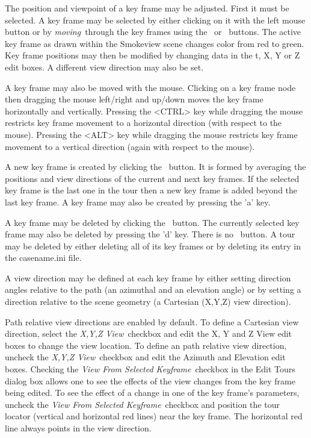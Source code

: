 \documentclass[11pt,twoside]{book}
\newcommand{\frameit}[1]{\fbox{\tt #1}}
\begin{document}
The position and viewpoint of a key frame may be adjusted.  First
it must be selected.  A key frame may be selected by either
clicking on it with the left mouse button or by {\em moving}\ through
the key frames using the \frameit{Next}\ or \frameit{Previous}\
buttons. The active key frame as drawn within the Smokeview scene changes color from red to green.
Key frame positions may then be modified by changing
data in the t, X, Y or Z edit boxes. A different view direction
may also be set.

A key frame may also be moved with the mouse.  Clicking on a
key frame node then dragging the mouse left/right and up/down
moves the key frame horizontally and vertically.  Pressing the
<CTRL> key while dragging the mouse
restricts key frame movement to a horizontal direction (with respect to the mouse).
Pressing the <ALT> key while dragging the mouse
restricts key frame movement to a vertical direction (again with respect to the mouse).

A new key frame is created by clicking the \frameit{Add}\ button.
It is formed by averaging the positions and view directions of the
current and next key frames. If the selected key frame is the last
one in the tour then a new key frame  is added beyond the last
key frame.  A key frame may also be created by pressing the 'a' key.

A key frame may be deleted by clicking the \frameit{Delete}\
button. The currently selected key frame may also be deleted by pressing the 'd' key.
There is no \frameit{Delete Tour}\ button. A tour may be
deleted by either deleting all of its key frames or by deleting its
entry in the casename.ini file.

A view direction may be defined at each key frame by either setting
direction angles relative to the path (an azimuthal and an elevation
angle) or by setting a direction relative to the scene geometry (a
Cartesian (X,Y,Z) view direction).

Path relative view directions are enabled by default.  To define a
Cartesian view direction, select the {\em X,Y,Z View}\ checkbox
and edit the X, Y and Z View edit boxes to change the view
location. To define an path relative view direction, uncheck the
{\em X,Y,Z View}\ checkbox and edit the Azimuth and Elevation edit
boxes. Checking the {\em View From Selected Keyframe}\ checkbox in
the Edit Tours dialog box allows one to see the effects of
the  view changes from the key frame being edited. To see the
effect of a change in one of the key frame's parameters, uncheck
the {\em View From Selected Keyframe}\ checkbox and position the
tour locator (vertical and horizontal red lines) near the
key frame.  The horizontal red line always points in the view
direction.
\end{document}
